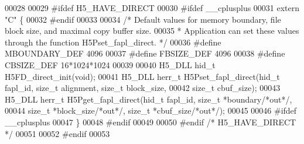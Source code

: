 \begin{DoxyCode}
00028 
00029 \textcolor{preprocessor}{#ifdef H5\_HAVE\_DIRECT}
00030 \textcolor{preprocessor}{#ifdef \_\_cplusplus}
00031 \textcolor{keyword}{extern} \textcolor{stringliteral}{"C"} \{
00032 \textcolor{preprocessor}{#endif}
00033 
00034 \textcolor{comment}{/* Default values for memory boundary, file block size, and maximal copy buffer size.}
00035 \textcolor{comment}{ * Application can set these values through the function H5Pset\_fapl\_direct. */}
00036 \textcolor{preprocessor}{#define MBOUNDARY\_DEF       4096}
00037 \textcolor{preprocessor}{#define FBSIZE\_DEF      4096}
00038 \textcolor{preprocessor}{#define CBSIZE\_DEF      16*1024*1024}
00039 
00040 H5\_DLL hid\_t H5FD\_direct\_init(\textcolor{keywordtype}{void});
00041 H5\_DLL herr\_t H5Pset\_fapl\_direct(hid\_t fapl\_id, \textcolor{keywordtype}{size\_t} alignment, \textcolor{keywordtype}{size\_t} block\_size,
00042             \textcolor{keywordtype}{size\_t} cbuf\_size);
00043 H5\_DLL herr\_t H5Pget\_fapl\_direct(hid\_t fapl\_id, \textcolor{keywordtype}{size\_t} *boundary\textcolor{comment}{/*out*/},
00044             \textcolor{keywordtype}{size\_t} *block\_size\textcolor{comment}{/*out*/}, \textcolor{keywordtype}{size\_t} *cbuf\_size\textcolor{comment}{/*out*/});
00045 
00046 \textcolor{preprocessor}{#ifdef \_\_cplusplus}
00047 \}
00048 \textcolor{preprocessor}{#endif}
00049 
00050 \textcolor{preprocessor}{#endif }\textcolor{comment}{/* H5\_HAVE\_DIRECT */}\textcolor{preprocessor}{}
00051 
00052 \textcolor{preprocessor}{#endif}
00053 
\end{DoxyCode}
